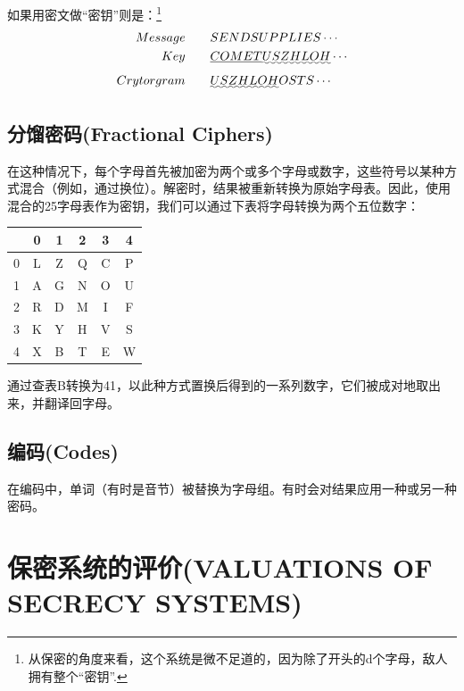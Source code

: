 \documentclass[]{article}
\begin{document}
如果用密文做“密钥”则是：\footnote{从保密的角度来看，这个系统是微不足道的，因为除了开头的d个字母，敌人拥有整个“密钥”.}
\begin{equation}
	\begin{aligned}
		Message\qquad    &SENDSUPPLIES\cdots \\
		Key\qquad        &\underline{COMET}\uwave{USZHLOH}\cdots \\
		Crytorgram\qquad &\uwave{USZHLOH}OSTS\cdots \nonumber
		\end{aligned}
\end{equation}

\subsection{分馏密码(Fractional Ciphers)}

在这种情况下，每个字母首先被加密为两个或多个字母或数字，这些符号以某种方式混合（例如，通过换位）。解密时，结果被重新转换为原始字母表。因此，使用混合的25字母表作为密钥，我们可以通过下表将字母转换为两个五位数字：
\begin{center}
	\begin{tabular}{c|c|c|c|c|c}
		
		& 0 & 1 & 2 & 3 & 4 \\ 
		\hline 
		0&L  & Z & Q & C & P \\ 
		\hline 
		1&A  & G & N & O & U \\ 
		\hline 
		2& R & D &M  & I & F \\ 
		\hline 
		3& K & Y & H & V & S \\ 
		\hline 
		4& X & B & T & E & W \\ 
		
	\end{tabular} 
\end{center}


通过查表B转换为41，以此种方式置换后得到的一系列数字，它们被成对地取出来，并翻译回字母。

\subsection{编码(Codes)}
在编码中，单词（有时是音节）被替换为字母组。有时会对结果应用一种或另一种密码。

\newpage

%   
%

\section{保密系统的评价(VALUATIONS OF SECRECY SYSTEMS)}
\end{document}
